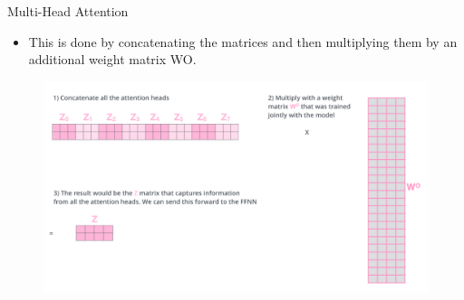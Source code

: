 \documentclass[handout]{beamer}
\begin{document}
\begin{frame}{Multi-Head Attention}

\begin{scriptsize}
\begin{itemize}
 \item This is done by concatenating the matrices and then multiplying them by an additional weight matrix WO.


\end{itemize}

\end{scriptsize}


     \begin{figure}[h]
        	\includegraphics[scale = 0.22]{pics/transformer_attention_heads_weight_matrix_o.png}
        \end{figure}




\end{frame}
\end{document}
